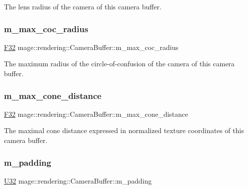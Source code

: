 The lens radius of the camera of this camera buffer. \hypertarget{structmage_1_1rendering_1_1_camera_buffer_a3273510e0a7bbdd9481fe67f9e223f59}{}\label{structmage_1_1rendering_1_1_camera_buffer_a3273510e0a7bbdd9481fe67f9e223f59} 
\subsubsection{\texorpdfstring{m\+\_\+max\+\_\+coc\+\_\+radius}{m\_max\_coc\_radius}}
{\footnotesize\ttfamily \hyperlink{namespacemage_aa97e833b45f06d60a0a9c4fc22ae02c0}{F32} mage\+::rendering\+::\+Camera\+Buffer\+::m\+\_\+max\+\_\+coc\+\_\+radius}

The maximum radius of the circle-\/of-\/confusion of the camera of this camera buffer. \hypertarget{structmage_1_1rendering_1_1_camera_buffer_a99515c320feafb88a2d2fdf24520975d}{}\label{structmage_1_1rendering_1_1_camera_buffer_a99515c320feafb88a2d2fdf24520975d} 
\subsubsection{\texorpdfstring{m\+\_\+max\+\_\+cone\+\_\+distance}{m\_max\_cone\_distance}}
{\footnotesize\ttfamily \hyperlink{namespacemage_aa97e833b45f06d60a0a9c4fc22ae02c0}{F32} mage\+::rendering\+::\+Camera\+Buffer\+::m\+\_\+max\+\_\+cone\+\_\+distance}

The maximal cone distance expressed in normalized texture coordinates of this camera buffer. \hypertarget{structmage_1_1rendering_1_1_camera_buffer_a89a72a725654361121771db8668f7f58}{}\label{structmage_1_1rendering_1_1_camera_buffer_a89a72a725654361121771db8668f7f58} 
\subsubsection{\texorpdfstring{m\+\_\+padding}{m\_padding}}
{\footnotesize\ttfamily \hyperlink{namespacemage_a41c104c036fba3756a74e19f793eeaa1}{U32} mage\+::rendering\+::\+Camera\+Buffer\+::m\+\_\+padding}

